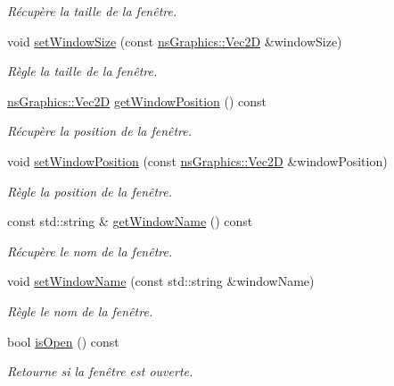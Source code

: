 \begin{DoxyCompactItemize}
\begin{DoxyCompactList}\small\item\em Récupère la taille de la fenêtre. \end{DoxyCompactList}\item 
void \hyperlink{class_min_g_l_a532d320b7b837998533fe6577ab45bc3}{set\+Window\+Size} (const \hyperlink{classns_graphics_1_1_vec2_d}{ns\+Graphics\+::\+Vec2D} \&window\+Size)
\begin{DoxyCompactList}\small\item\em Règle la taille de la fenêtre. \end{DoxyCompactList}\item 
\hyperlink{classns_graphics_1_1_vec2_d}{ns\+Graphics\+::\+Vec2D} \hyperlink{class_min_g_l_a1ea6ea098988db36f5bf18713f9f3347}{get\+Window\+Position} () const
\begin{DoxyCompactList}\small\item\em Récupère la position de la fenêtre. \end{DoxyCompactList}\item 
void \hyperlink{class_min_g_l_a9239873a52e437457af03f002f5df2b6}{set\+Window\+Position} (const \hyperlink{classns_graphics_1_1_vec2_d}{ns\+Graphics\+::\+Vec2D} \&window\+Position)
\begin{DoxyCompactList}\small\item\em Règle la position de la fenêtre. \end{DoxyCompactList}\item 
const std\+::string \& \hyperlink{class_min_g_l_a46cea08ec9ef4a0678f425000ca77e5b}{get\+Window\+Name} () const
\begin{DoxyCompactList}\small\item\em Récupère le nom de la fenêtre. \end{DoxyCompactList}\item 
void \hyperlink{class_min_g_l_a462ab2edc0eb28990638541873869e0e}{set\+Window\+Name} (const std\+::string \&window\+Name)
\begin{DoxyCompactList}\small\item\em Règle le nom de la fenêtre. \end{DoxyCompactList}\item 
bool \hyperlink{class_min_g_l_a05a0da9d0729e9c7dbd1121b0956866d}{is\+Open} () const
\begin{DoxyCompactList}\small\item\em Retourne si la fenêtre est ouverte. \end{DoxyCompactList}\end{DoxyCompactItemize}
